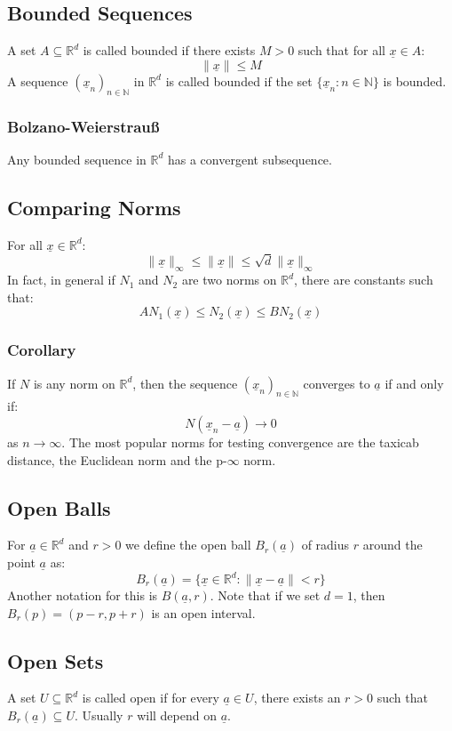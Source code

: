 \documentclass[12pt]{article}
\newcommand{\seq}[2]{(#1_#2)_{#2\in\mathbb{N}}}
\begin{document}
\subsection{Bounded Sequences}
A set \(A\subseteq \mathbb{R}^d\) is called bounded if there exists \(M>0\) such that for all \(\underline{x}\in A\):
\[\|\underline{x}\|\leq M\]
A sequence \(\seq{\underline{x}}{n}\) in \(\mathbb{R}^d\) is called bounded if the set \(\{\underline{x}_n:n\in\mathbb{N}\}\) is bounded.
\subsubsection{Bolzano-Weierstrau\ss}
Any bounded sequence in \(\mathbb{R}^d\) has a convergent subsequence.
\subsection{Comparing Norms}
For all \(\underline{x}\in\mathbb{R}^d\):
\[\|\underline{x}\|_\infty\leq \|\underline{x}\|\leq \sqrt{d}\|\underline{x}\|_{\infty}\]
In fact, in general if \(N_1\) and \(N_2\) are two norms on \(\mathbb{R}^d\), there are constants such that:
\[AN_1(\underline{x})\leq N_2(\underline{x})\leq BN_2(\underline{x})\]
\subsubsection{Corollary}
If \(N\) is any norm on \(\mathbb{R}^d\), then the sequence \(\seq{\underline{x}}{n}\) converges to \(\underline{a}\) if and only if:
\[N(\underline{x}_n-\underline{a})\to 0\]
as \(n\to\infty\). The most popular norms for testing convergence are the taxicab distance, the Euclidean norm and the p-\(\infty\) norm.
\subsection{Open Balls}
For \(\underline{a}\in\mathbb{R}^d\) and \(r>0\) we define the open ball \(B_r(\underline{a})\) of radius \(r\) around the point \(\underline{a}\) as:
\[B_r(\underline{a})=\{\underline{x}\in\mathbb{R}^d: \|\underline{x}-\underline{a}\|<r\}\]
Another notation for this is \(B(\underline{a}, r)\). Note that if we set \(d=1\), then \(B_r(p)=(p-r, p+r)\) is an open interval.
\subsection{Open Sets}
A set \(U\subseteq\mathbb{R}^d\) is called open if for every \(\underline{a}\in U\), there exists an \(r>0\) such that \(B_r(\underline{a})\subseteq U\). Usually \(r\) will depend on \(\underline{a}\).
\end{document}
